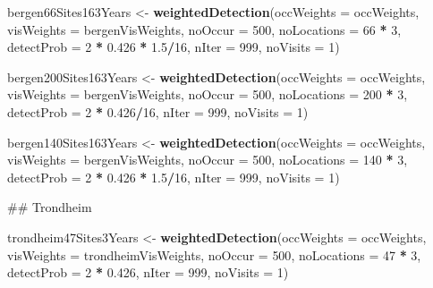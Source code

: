 \documentclass[]{article}
\newenvironment{Shaded}{\begin{snugshade}}{\end{snugshade}}
\newcommand{\KeywordTok}[1]{\textcolor[rgb]{0.13,0.29,0.53}{\textbf{#1}}}
\newcommand{\DataTypeTok}[1]{\textcolor[rgb]{0.13,0.29,0.53}{#1}}
\newcommand{\DecValTok}[1]{\textcolor[rgb]{0.00,0.00,0.81}{#1}}
\newcommand{\FloatTok}[1]{\textcolor[rgb]{0.00,0.00,0.81}{#1}}
\newcommand{\StringTok}[1]{\textcolor[rgb]{0.31,0.60,0.02}{#1}}
\newcommand{\OperatorTok}[1]{\textcolor[rgb]{0.81,0.36,0.00}{\textbf{#1}}}
\newcommand{\NormalTok}[1]{#1}
\begin{document}
\begin{Shaded}
\begin{Highlighting}[]
\NormalTok{bergen66Sites163Years <-}\StringTok{ }\KeywordTok{weightedDetection}\NormalTok{(}\DataTypeTok{occWeights =}\NormalTok{ occWeights, }\DataTypeTok{visWeights =}\NormalTok{ bergenVisWeights, }
    \DataTypeTok{noOccur =} \DecValTok{500}\NormalTok{, }\DataTypeTok{noLocations =} \DecValTok{66} \OperatorTok{*}\StringTok{ }\DecValTok{3}\NormalTok{, }\DataTypeTok{detectProb =} \DecValTok{2} \OperatorTok{*}\StringTok{ }\FloatTok{0.426} \OperatorTok{*}\StringTok{ }\FloatTok{1.5}\OperatorTok{/}\DecValTok{16}\NormalTok{, }\DataTypeTok{nIter =} \DecValTok{999}\NormalTok{, }
    \DataTypeTok{noVisits =} \DecValTok{1}\NormalTok{)}

\NormalTok{bergen200Sites163Years <-}\StringTok{ }\KeywordTok{weightedDetection}\NormalTok{(}\DataTypeTok{occWeights =}\NormalTok{ occWeights, }\DataTypeTok{visWeights =}\NormalTok{ bergenVisWeights, }
    \DataTypeTok{noOccur =} \DecValTok{500}\NormalTok{, }\DataTypeTok{noLocations =} \DecValTok{200} \OperatorTok{*}\StringTok{ }\DecValTok{3}\NormalTok{, }\DataTypeTok{detectProb =} \DecValTok{2} \OperatorTok{*}\StringTok{ }\FloatTok{0.426}\OperatorTok{/}\DecValTok{16}\NormalTok{, }\DataTypeTok{nIter =} \DecValTok{999}\NormalTok{, }
    \DataTypeTok{noVisits =} \DecValTok{1}\NormalTok{)}

\NormalTok{bergen140Sites163Years <-}\StringTok{ }\KeywordTok{weightedDetection}\NormalTok{(}\DataTypeTok{occWeights =}\NormalTok{ occWeights, }\DataTypeTok{visWeights =}\NormalTok{ bergenVisWeights, }
    \DataTypeTok{noOccur =} \DecValTok{500}\NormalTok{, }\DataTypeTok{noLocations =} \DecValTok{140} \OperatorTok{*}\StringTok{ }\DecValTok{3}\NormalTok{, }\DataTypeTok{detectProb =} \DecValTok{2} \OperatorTok{*}\StringTok{ }\FloatTok{0.426} \OperatorTok{*}\StringTok{ }\FloatTok{1.5}\OperatorTok{/}\DecValTok{16}\NormalTok{, }\DataTypeTok{nIter =} \DecValTok{999}\NormalTok{, }
    \DataTypeTok{noVisits =} \DecValTok{1}\NormalTok{)}




\NormalTok{## Trondheim}

\NormalTok{trondheim47Sites3Years <-}\StringTok{ }\KeywordTok{weightedDetection}\NormalTok{(}\DataTypeTok{occWeights =}\NormalTok{ occWeights, }\DataTypeTok{visWeights =}\NormalTok{ trondheimVisWeights, }
    \DataTypeTok{noOccur =} \DecValTok{500}\NormalTok{, }\DataTypeTok{noLocations =} \DecValTok{47} \OperatorTok{*}\StringTok{ }\DecValTok{3}\NormalTok{, }\DataTypeTok{detectProb =} \DecValTok{2} \OperatorTok{*}\StringTok{ }\FloatTok{0.426}\NormalTok{, }\DataTypeTok{nIter =} \DecValTok{999}\NormalTok{, }
    \DataTypeTok{noVisits =} \DecValTok{1}\NormalTok{)}


\end{Highlighting}
\end{Shaded}
\end{document}
